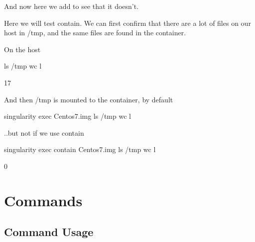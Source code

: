 \documentclass[letterpaper,10pt,english]{sphinxmanual}
\begin{document}
%
\begin{sphinxVerbatim}[commandchars=\\\{\}]
       

\end{sphinxVerbatim}

And now here we add  to see that it doesn’t.

%
\begin{sphinxVerbatim}[commandchars=\\\{\}]
        
\end{sphinxVerbatim}

Here we will test contain. We can first confirm that there are a lot of files on our host in /tmp, and the same files are found in the container.

%
\begin{sphinxVerbatim}[commandchars=\\\{\}]
\PYGZsh{} On the host

\PYGZdl{} ls /tmp \textbar{} wc \PYGZhy{}l

17


\PYGZsh{} And then /tmp is mounted to the container, by default

\PYGZdl{} singularity exec Centos7.img  ls /tmp \textbar{} wc \PYGZhy{}l


\PYGZsh{} ..but not if we use \PYGZhy{}\PYGZhy{}contain

\PYGZdl{} singularity exec \PYGZhy{}\PYGZhy{}contain Centos7.img  ls /tmp \textbar{} wc \PYGZhy{}l

0
\end{sphinxVerbatim}


\section{Commands}
\label{\detokenize{appendix:commands}}

\subsection{Command Usage}
\label{\detokenize{appendix:command-usage}}\label{\detokenize{appendix:id22}}
\end{document}
